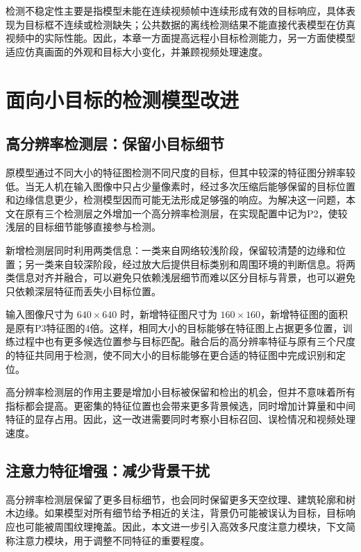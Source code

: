 检测不稳定性主要是指模型未能在连续视频帧中连续形成有效的目标响应，具体表现为目标框不连续或检测缺失；公共数据的离线检测结果不能直接代表模型在仿真视频中的实际性能。因此，本章一方面提高远程小目标检测能力，另一方面使模型适应仿真画面的外观和目标大小变化，并兼顾视频处理速度。

\section{面向小目标的检测模型改进}
\label{sec:ch5_architecture}

\subsection{高分辨率检测层：保留小目标细节}
\label{subsec:ch5_p2}

原模型通过不同大小的特征图检测不同尺度的目标，但其中较深的特征图分辨率较低。当无人机在输入图像中只占少量像素时，经过多次压缩后能够保留的目标位置和边缘信息更少，检测模型因而可能无法形成足够强的响应。为解决这一问题，本文在原有三个检测层之外增加一个高分辨率检测层，在实现配置中记为P2，使较浅层的目标细节能够直接参与检测。

新增检测层同时利用两类信息：一类来自网络较浅阶段，保留较清楚的边缘和位置；另一类来自较深阶段，经过放大后提供目标类别和周围环境的判断信息。将两类信息对齐并融合，可以避免只依赖浅层细节而难以区分目标与背景，也可以避免只依赖深层特征而丢失小目标位置。

输入图像尺寸为 $640\times640$ 时，新增特征图尺寸为 $160\times160$，新增特征图的面积是原有P3特征图的4倍。这样，相同大小的目标能够在特征图上占据更多位置，训练过程中也有更多候选位置参与目标匹配。融合后的高分辨率特征与原有三个尺度的特征共同用于检测，使不同大小的目标能够在更合适的特征图中完成识别和定位。

高分辨率检测层的作用主要是增加小目标被保留和检出的机会，但并不意味着所有指标都会提高。更密集的特征位置也会带来更多背景候选，同时增加计算量和中间特征的显存占用。因此，这一改进需要同时考察小目标召回、误检情况和视频处理速度。

\subsection{注意力特征增强：减少背景干扰}
\label{subsec:ch5_ema}

高分辨率检测层保留了更多目标细节，也会同时保留更多天空纹理、建筑轮廓和树木边缘。如果模型对所有细节给予相近的关注，背景仍可能被误认为目标，目标响应也可能被周围纹理掩盖。因此，本文进一步引入高效多尺度注意力模块，下文简称注意力模块，用于调整不同特征的重要程度。

